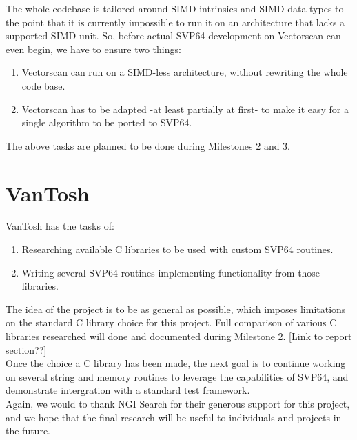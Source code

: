 The whole codebase is tailored around SIMD intrinsics and SIMD data types to
the point that it is currently impossible to run it on an architecture that
lacks a supported SIMD unit. So, before actual SVP64 development on Vectorscan
can even begin, we have to ensure two things:\\


\begin{enumerate}
  \item Vectorscan can run on a SIMD-less architecture, without rewriting
   the whole code base.
  \item Vectorscan has to be adapted -at least partially at first- to make it easy
   for a single algorithm to be ported to SVP64.
\end{enumerate}

The above tasks are planned to be done during Milestones 2 and 3.

\section{VanTosh}

VanTosh has the tasks of:

\begin{enumerate}
  \item Researching available C libraries to be used with custom SVP64 routines.
  \item Writing several SVP64 routines implementing functionality from those libraries.
\end{enumerate}

The idea of the project is to be as general as possible, which imposes limitations
on the standard C library choice for this project. Full comparison of various
C libraries researched will done and documented during Milestone 2.
[Link to report section??]\\

Once the choice a C library has been made, the next goal is to continue working on
several string and memory routines to leverage the capabilities of SVP64,
and demonstrate intergration with a standard test framework.\\

Again, we would to thank NGI Search for their generous support for
this project, and we hope that the final research will be useful to individuals
and projects in the future.\\
